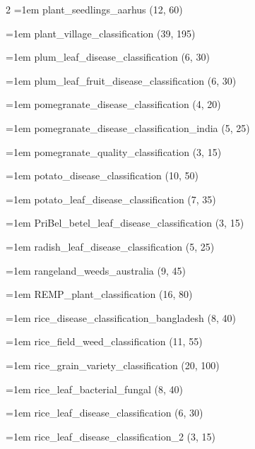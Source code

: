 \begin{multicols}{2}
\hangindent=1em plant\_\allowbreak{}seedlings\_\allowbreak{}aarhus (12, 60)\par
\hangindent=1em plant\_\allowbreak{}village\_\allowbreak{}classification (39, 195)\par
\hangindent=1em plum\_\allowbreak{}leaf\_\allowbreak{}disease\_\allowbreak{}classification (6, 30)\par
\hangindent=1em plum\_\allowbreak{}leaf\_\allowbreak{}fruit\_\allowbreak{}disease\_\allowbreak{}classification (6, 30)\par
\hangindent=1em pomegranate\_\allowbreak{}disease\_\allowbreak{}classification (4, 20)\par
\hangindent=1em pomegranate\_\allowbreak{}disease\_\allowbreak{}classification\_\allowbreak{}india (5, 25)\par
\hangindent=1em pomegranate\_\allowbreak{}quality\_\allowbreak{}classification (3, 15)\par
\hangindent=1em potato\_\allowbreak{}disease\_\allowbreak{}classification (10, 50)\par
\hangindent=1em potato\_\allowbreak{}leaf\_\allowbreak{}disease\_\allowbreak{}classification (7, 35)\par
\hangindent=1em PriBel\_\allowbreak{}betel\_\allowbreak{}leaf\_\allowbreak{}disease\_\allowbreak{}classification (3, 15)\par
\hangindent=1em radish\_\allowbreak{}leaf\_\allowbreak{}disease\_\allowbreak{}classification (5, 25)\par
\hangindent=1em rangeland\_\allowbreak{}weeds\_\allowbreak{}australia (9, 45)\par
\hangindent=1em REMP\_\allowbreak{}plant\_\allowbreak{}classification (16, 80)\par
\hangindent=1em rice\_\allowbreak{}disease\_\allowbreak{}classification\_\allowbreak{}bangladesh (8, 40)\par
\hangindent=1em rice\_\allowbreak{}field\_\allowbreak{}weed\_\allowbreak{}classification (11, 55)\par
\hangindent=1em rice\_\allowbreak{}grain\_\allowbreak{}variety\_\allowbreak{}classification (20, 100)\par
\hangindent=1em rice\_\allowbreak{}leaf\_\allowbreak{}bacterial\_\allowbreak{}fungal (8, 40)\par
\hangindent=1em rice\_\allowbreak{}leaf\_\allowbreak{}disease\_\allowbreak{}classification (6, 30)\par
\hangindent=1em rice\_\allowbreak{}leaf\_\allowbreak{}disease\_\allowbreak{}classification\_\allowbreak{}2 (3, 15)\par

\end{multicols}
